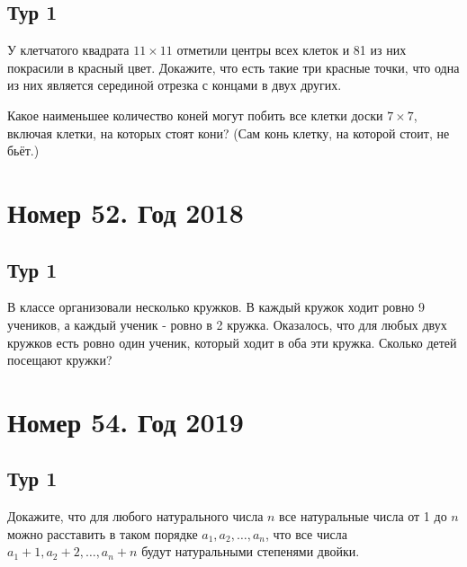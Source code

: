 \documentclass[11pt, a4paper]{common/document_template}
\begin{document}
\section{Тур 1}

\begin{exercise}
У клетчатого квадрата $11 \times 11$ отметили центры всех клеток и 81 из них покрасили в красный цвет. Докажите, что есть такие три красные точки, что одна из них является серединой отрезка с концами в двух других.
\end{exercise}

\begin{Solution}
   
\end{Solution}

\begin{exercise}
Какое наименьшее количество коней могут побить все клетки доски $7 \times 7$, включая клетки, на которых стоят кони? (Сам конь клетку, на которой стоит, не бьёт.)
\end{exercise}

\chapter{Номер 52. Год 2018}

\section{Тур 1}

\begin{exercise}
В классе организовали несколько кружков. В каждый кружок ходит ровно 9 учеников, а каждый ученик - ровно в 2 кружка. Оказалось, что для любых двух кружков есть ровно один ученик, который ходит в оба эти кружка. Сколько детей посещают кружки?
\end{exercise}

\chapter{Номер 54. Год 2019}

\section{Тур 1}

\begin{exercise}
Докажите, что для любого натурального числа $n$ все натуральные числа от 1 до $n$ можно расставить в таком порядке $a_{1}, a_{2}, \dots, a_{n}$, что все числа $a_{1} + 1, a_{2} + 2, \dots, a_{n} + n$ будут натуральными степенями двойки.
\end{exercise}
\end{document}

